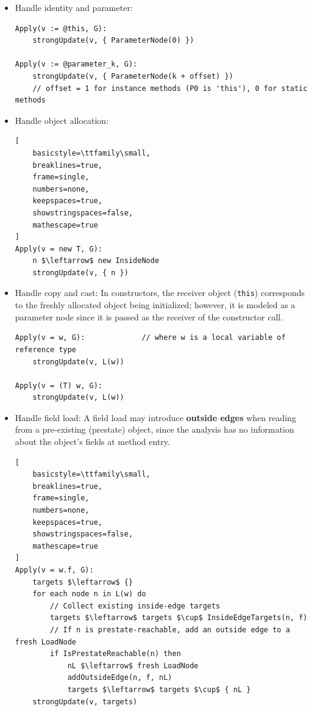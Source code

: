 
\begin{itemize}
    \item[a] Handle identity and parameter: \label{agl4a}
\begin{lstlisting}
Apply(v := @this, G):
    strongUpdate(v, { ParameterNode(0) })

Apply(v := @parameter_k, G):
    strongUpdate(v, { ParameterNode(k + offset) })
    // offset = 1 for instance methods (P0 is 'this'), 0 for static methods
\end{lstlisting}

\item[b] Handle object allocation: \label{agl4b}
\begin{lstlisting}[
    basicstyle=\ttfamily\small,
    breaklines=true,
    frame=single,
    numbers=none,
    keepspaces=true,
    showstringspaces=false,
    mathescape=true
]
Apply(v = new T, G):
    n $\leftarrow$ new InsideNode
    strongUpdate(v, { n })
\end{lstlisting}

\item[c] Handle copy and cast: \label{agl4c} \newline
In constructors, the receiver object (\texttt{this}) corresponds to the freshly allocated object being initialized; however, it is modeled as a parameter node since it is passed as the receiver of the constructor call.
\begin{lstlisting}
Apply(v = w, G):             // where w is a local variable of reference type
    strongUpdate(v, L(w))

Apply(v = (T) w, G):
    strongUpdate(v, L(w))
\end{lstlisting}

\item[d] Handle field load: \label{agl4d} 
\newline A field load may introduce \textbf{outside edges} when reading from a pre-existing (prestate) object, since the analysis has no information about the object's fields at method entry. 

\begin{lstlisting}[
    basicstyle=\ttfamily\small,
    breaklines=true,
    frame=single,
    numbers=none,
    keepspaces=true,
    showstringspaces=false,
    mathescape=true
]
Apply(v = w.f, G):
    targets $\leftarrow$ {}
    for each node n in L(w) do
        // Collect existing inside-edge targets
        targets $\leftarrow$ targets $\cup$ InsideEdgeTargets(n, f)
        // If n is prestate-reachable, add an outside edge to a fresh LoadNode
        if IsPrestateReachable(n) then
            nL $\leftarrow$ fresh LoadNode
            addOutsideEdge(n, f, nL)
            targets $\leftarrow$ targets $\cup$ { nL }
    strongUpdate(v, targets)


\end{lstlisting}
\end{itemize}
